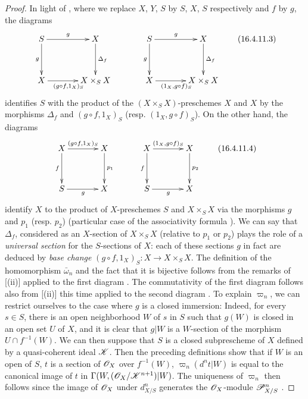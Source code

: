 \begin{proof}
In light of , where we replace $X$, $Y$, $S$ by $S$, $X$, $S$ respectively and $f$ by $g$, the diagrams
\[
  \label{IV.16.4.11.3}
  \xymatrix@=3pc{
    S \ar[r]^-g \ar[d]_-g &  X \ar[d]^-{\Delta_f} & S \ar[r]^-g  \ar[d]_-g & X \ar[d]^-{\Delta_f}  \\
    X \ar[r]_{(g\circ f, 1_X)_S} & X\times_S X & X \ar[r]_{(1_X, g\circ f)_S} & X \times_S X
  }
  \tag{16.4.11.3}
\]
identifies $S$ with the product of the $(X \times_S X)$-preschemes $X$ and $X$ by the morphisms $\Delta_f$ and $(g\circ f, 1_X)_S$ (resp. $(1_X, g\circ f)_S$).
On the other hand, the diagrams
\[
  \label{IV.16.4.11.4}
  \xymatrix@=3pc{
    X \ar[r]^{(g\circ f, 1_X)_S} \ar[d]_-f &  X \ar[d]^-{p_1} &  X \ar[r]^{(1_X, g\circ f)_S} \ar[d]_-f &  X \ar[d]^-{p_2} \\
    S \ar[r]_{g} & X & S \ar[r]_{g} & X
  }
  \tag{16.4.11.4}
\]
identify $X$ to the product of $X$-preschemes $S$ and $X \times_S X$ via the morphisms $g$ and $p_1$ (resp. $p_2$) (particular case of the associativity formula ).
We can say that $\Delta_f$, considered as an $X$-section of $X \times_S X$ (relative to $p_1$ or $p_2$) plays the role of a \emph{universal section} for the $S$-sections of $X$:
each of these sections $g$ in fact are deduced by \emph{base change} $(g \circ f, 1_X)_S: X \to X \times_S X$.
The definition of the homomorphism $\bar\omega_n$ and the fact that it is bijective follows from the remarks of [(ii)] applied to the first diagram .
The commutativity of the first diagram  follows also from [(ii)] this time applied to the second diagram .
To explain $\varpi_n$, we can restrict ourselves to the case where $g$ is a closed immersion:
Indeed, for every $s\in S$, there is an open neighborhood $W$ of $s$ in $S$ such that $g(W)$ is closed in an open set $U$ of $X$, and it is clear that $g|W$ is a $W$-section of the morphism $U \cap f^{-1}(W)$.
We can then suppose that $S$ is a closed subprescheme of $X$ defined by a quasi-coherent ideal $\mathscr{K}$.
Then the preceding definitions show that if $W$ is an open of $S$, $t$ is a section of $\mathscr{O}_X$ over $f^{-1}(W)$, $\varpi_n(d^n t|W)$ is equal to the canonical image of $t$ in $\Gamma(W, (\mathscr{O}_X/\mathscr{K}^{n+1})|W)$. 
The uniqueness of $\varpi_n$ then follows since the image of $\mathscr{O}_X$ under $d_{X/S}^n$ generates the $\mathscr{O}_X$-module $\mathscr{P}_{X/S}^n$ .
\end{proof}

